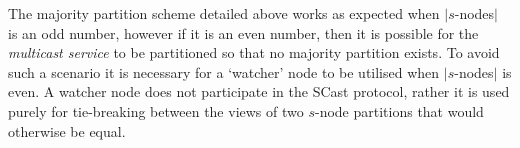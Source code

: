     The majority partition scheme detailed above works as expected when $|s$-nodes$|$ is an odd number, however if it is an even number, then it is possible for the \emph{multicast service} to be partitioned so that no majority partition exists.  To avoid such a scenario it is necessary for a \textquoteleft{}watcher' node to be utilised when $|s$-nodes$|$ is even.  A watcher node does not participate in the \textsf{SCast} protocol, rather it is used purely for tie-breaking between the views of two $s$-node partitions that would otherwise be equal.  
    
%
%
